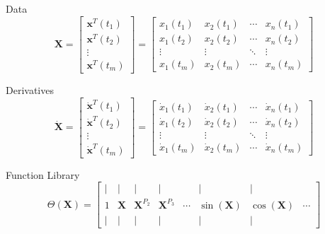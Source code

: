 \documentclass[aspectratio=169]{beamer}
\begin{document}
\begin{frame}{Data}
	\[ \mathbf X = \begin{bmatrix}
		\mathbf x^T(t_1) \\ \mathbf x^T(t_2) \\ \vdots \\ \mathbf x^T(t_m)
	\end{bmatrix} = \begin{bmatrix}
		x_1(t_1) & x_2(t_1) & \cdots & x_n(t_1) \\
		x_1(t_2) & x_2(t_2) & \cdots & x_n(t_2) \\
		\vdots & \vdots & \ddots & \vdots \\ 
		x_1(t_m) & x_2(t_m) & \cdots & x_n(t_m)
	\end{bmatrix} \]
\end{frame}

\begin{frame}{Derivatives}
	\[ \mathbf {\dot X} = \begin{bmatrix}
		\mathbf {\dot x}^T(t_1) \\ \mathbf {\dot x}^T(t_2) \\ \vdots \\ \mathbf {\dot x}^T(t_m)
	\end{bmatrix} = \begin{bmatrix}
		\dot x_1(t_1) & \dot x_2(t_1) & \cdots & \dot x_n(t_1) \\
		\dot x_1(t_2) & \dot x_2(t_2) & \cdots & \dot x_n(t_2) \\
		\vdots & \vdots & \ddots & \vdots \\ 
		\dot x_1(t_m) & \dot x_2(t_m) & \cdots & \dot x_n(t_m)
	\end{bmatrix} \]
\end{frame}

\begin{frame}{Function Library}
	\[  \Theta(\mathbf X) = \begin{bmatrix} \mid & \mid & \mid & \mid &  & \mid & \mid & \\ 1 & \mathbf X & {\mathbf X}^{P_2} & {\mathbf X}^{P_3} & \cdots & \sin{(\mathbf X)} & \cos{(\mathbf X)} & \cdots \\ \mid & \mid & \mid & \mid & & \mid & \mid & \end{bmatrix}  \]
\end{frame}
\end{document}
